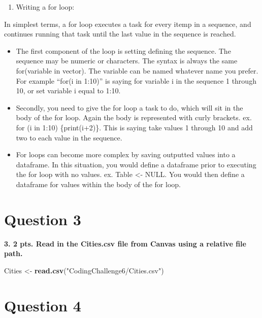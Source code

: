\documentclass[
]{article}
\newenvironment{Shaded}{\begin{snugshade}}{\end{snugshade}}
\newcommand{\FunctionTok}[1]{\textcolor[rgb]{0.13,0.29,0.53}{\textbf{#1}}}
\newcommand{\NormalTok}[1]{#1}
\newcommand{\OtherTok}[1]{\textcolor[rgb]{0.56,0.35,0.01}{#1}}
\newcommand{\StringTok}[1]{\textcolor[rgb]{0.31,0.60,0.02}{#1}}
\providecommand{\tightlist}{%
  \setlength{\itemsep}{0pt}\setlength{\parskip}{0pt}}
\begin{document}
\begin{enumerate}
\def\labelenumi{\alph{enumi}.}
\setcounter{enumi}{1}
\tightlist
\item
  Writing a for loop:
\end{enumerate}

In simplest terms, a for loop executes a task for every itemp in a
sequence, and continues running that task until the last value in the
sequence is reached.

\begin{itemize}
\item
  The first component of the loop is setting defining the sequence. The
  sequence may be numeric or characters. The syntax is always the same
  for(variable in vector). The variable can be named whatever name you
  prefer. For example ``for(i in 1:10)'' is saying for variable i in the
  sequence 1 through 10, or set variable i equal to 1:10.
\item
  Secondly, you need to give the for loop a task to do, which will sit
  in the body of the for loop. Again the body is represented with curly
  brackets. ex. for (i in 1:10) \{print(i+2)\}. This is saying take
  values 1 through 10 and add two to each value in the sequence.
\item
  For loops can become more complex by saving outputted values into a
  dataframe. In this situation, you would define a dataframe prior to
  executing the for loop with no values. ex. Table \textless- NULL. You
  would then define a dataframe for values within the body of the for
  loop.
\end{itemize}

\section{Question 3}\label{question-3}

\textbf{3. 2 pts. Read in the Cities.csv file from Canvas using a
relative file path.}

\begin{Shaded}
\begin{Highlighting}[]
\NormalTok{Cities }\OtherTok{\textless{}{-}} \FunctionTok{read.csv}\NormalTok{(}\StringTok{"CodingChallenge6/Cities.csv"}\NormalTok{)}
\end{Highlighting}
\end{Shaded}

\section{Question 4}\label{question-4}
\end{document}
